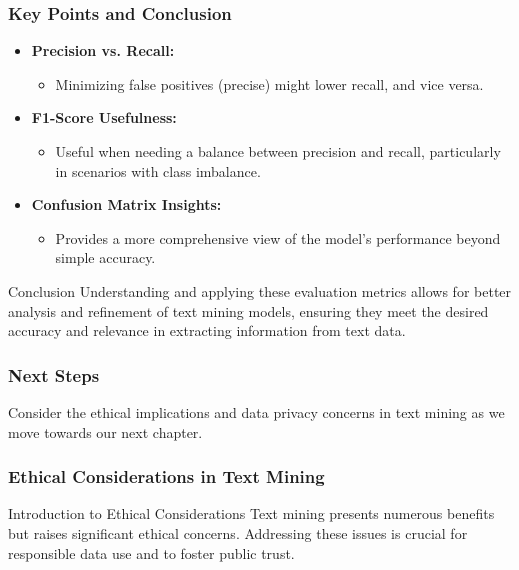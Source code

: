 \documentclass[aspectratio=169]{beamer}
\begin{document}
\begin{frame}[fragile]
    \frametitle{Key Points and Conclusion}
    \begin{itemize}
        \item \textbf{Precision vs. Recall:} 
            \begin{itemize}
                \item Minimizing false positives (precise) might lower recall, and vice versa.
            \end{itemize}
        \item \textbf{F1-Score Usefulness:} 
            \begin{itemize}
                \item Useful when needing a balance between precision and recall, particularly in scenarios with class imbalance.
            \end{itemize}
        \item \textbf{Confusion Matrix Insights:} 
            \begin{itemize}
                \item Provides a more comprehensive view of the model's performance beyond simple accuracy.
            \end{itemize}
    \end{itemize}

    \begin{block}{Conclusion}
        Understanding and applying these evaluation metrics allows for better analysis and refinement of text mining models, ensuring they meet the desired accuracy and relevance in extracting information from text data.
    \end{block}
\end{frame}

\begin{frame}[fragile]
    \frametitle{Next Steps}
    Consider the ethical implications and data privacy concerns in text mining as we move towards our next chapter.
\end{frame}

\begin{frame}[fragile]
    \frametitle{Ethical Considerations in Text Mining}
    \begin{block}{Introduction to Ethical Considerations}
        Text mining presents numerous benefits but raises significant ethical concerns. 
        Addressing these issues is crucial for responsible data use and to foster public trust.
    \end{block}
\end{frame}
\end{document}
